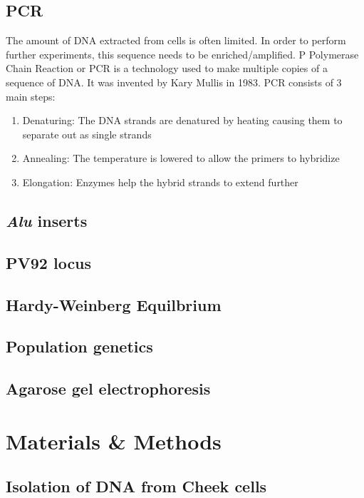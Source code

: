 \documentclass[paper=a4, fontsize=11pt]{scrartcl} %
\numberwithin{equation}{section} %
\numberwithin{figure}{section} %
\numberwithin{table}{section} %
\begin{document}
\subsection{PCR}
The amount of DNA extracted from cells is often limited. In order to perform further experiments, this sequence needs to be enriched/amplified. P
Polymerase Chain Reaction or PCR is a technology used to make multiple copies of a sequence of DNA. It was invented by Kary Mullis in 1983. \cite{bartlett2003short}
PCR consists of 3 main steps:
\begin{enumerate}
\item Denaturing: The DNA strands are denatured by heating causing them to separate out as single strands
\item Annealing: The temperature is lowered to allow the primers to hybridize

\item Elongation: Enzymes help the hybrid strands to extend further
\end{enumerate}

\subsection{\textit{Alu} inserts}
\subsection{PV92 locus}
\subsection{Hardy-Weinberg Equilbrium}
\subsection{Population genetics}
\subsection{Agarose gel electrophoresis}


\section{Materials \& Methods}

\subsection{Isolation of DNA from Cheek cells}
\end{document}
